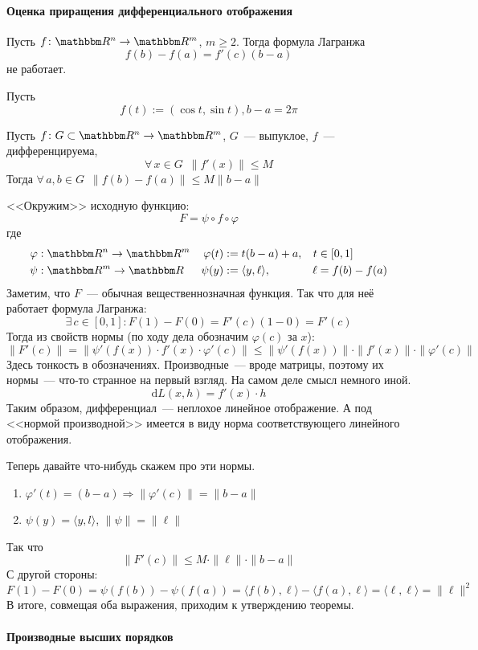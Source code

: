 \documentclass[12pt]{../../../notes}
\begin{document}
\paragraph{Оценка приращения дифференциального отображения}
\label{par:diffspace::diffestim}

\begin{prop}\label{prop:diffspace::diffestim::lagrfail}
  Пусть $f\colon \R^n \to \R^m$, $m \geqslant 2$. Тогда формула Лагранжа
  \[
    f(b) - f(a) = f'(c)(b - a)
  \]
  не работает.
\end{prop}
\begin{exmp*}\label{exmp:diffspace::diffestim::lagrfail}
  Пусть 
  \[
    f(t) := (\cos t, \sin t), b - a = 2\pi
  \]
\end{exmp*}

\begin{thrm}\label{thrm:diffspace::diffestim::diffestim}
  Пусть $f\colon G \subset \R^n \to \R^m$, $G$~--- выпуклое, $f$~--- дифференцируема, 
  \[ 
    \forall\, x \in G \;\: \| f'(x) \| \leqslant M 
  \]
  Тогда $\forall\, a,b \in G \;\: \|f(b) - f(a)\| \leqslant M \| b-a \|$
\end{thrm}
\begin{ittproof}
  <<Окружим>>  исходную функцию:
  \[
    F = \psi \circ f \circ \varphi
  \]
  где 
  \begin{align*}
    \varphi&: \R^n \to \R^m & \varphi(t) &:= t(b-a) + a, & t&\in [0,1] \\
    \psi&: \R^m \to \R & \psi(y) &:= \langle y, \ell \rangle, & \ell &= f(b)-f(a) 
  \end{align*}
  Заметим, что $F$~--- обычная вещественнозначная функция. Так что для неё работает формула
  Лагранжа:
  \[
    \exists\, c \in [0,1] \colon F(1)-F(0) = F'(c)(1-0) = F'(c)
  \]
  Тогда из свойств нормы (по ходу дела обозначим $\varphi(c)$ за $x$):
  \[
    \|F'(c)\| = \|\psi'(f(x)) \cdot f'(x) \cdot \varphi'(c)\| \leqslant 
    \|\psi'(f(x)) \| \cdot \| f'(x) \| \cdot \| \varphi'(c)\|
  \]
  Здесь тонкость в обозначениях. Производные~--- вроде матрицы, поэтому их нормы~--- что-то
  странное на первый взгляд. На самом деле смысл немного иной. 
  \[
    \mathrm d L(x, h) = f'(x) \cdot h
  \]
  Таким образом, дифференциал~--- неплохое линейное отображение. А под <<нормой производной>>
  имеется в виду норма соответствующего линейного отображения.

  Теперь давайте что-нибудь скажем про эти нормы. 
  \begin{enumerate}
    \item $\varphi'(t) = (b-a) \Rightarrow \| \varphi'(c) \| = \| b - a\|$
    \item $\psi(y) = \langle y, l \rangle$, $\| \psi\| = \|\ell\|$      
  \end{enumerate}
  Так что 
  \[
    \| F'(c)\| \leqslant M \cdot \| \ell \| \cdot \|b-a\|
  \]
  С другой стороны:
  \[
    F(1) - F(0) = \psi(f(b)) - \psi(f(a)) = \langle f(b), \ell \rangle - \langle f(a), \ell \rangle
    = \langle \ell, \ell \rangle  = \|\ell \|^2
  \]
  В итоге, совмещая оба выражения, приходим к утверждению теоремы.
\end{ittproof}

\paragraph{Производные высших порядков}
\label{par:diffspace::highdiff}
\end{document}
